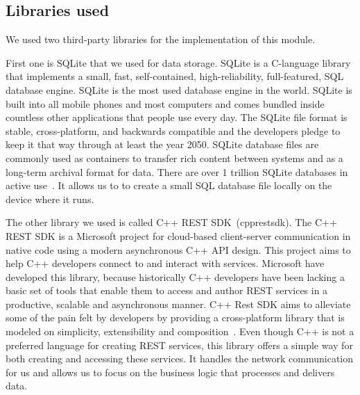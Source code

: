 \subsection{Libraries used}
We used two third-party libraries for the implementation of this module.
\par
First one is SQLite that we used for data storage. SQLite is a C-language library that implements a small, fast, self-contained, high-reliability, full-featured, SQL database engine. SQLite is the most used database engine in the world. SQLite is built into all mobile phones and most computers and comes bundled inside countless other applications that people use every day. The SQLite file format is stable, cross-platform, and backwards compatible and the developers pledge to keep it that way through at least the year 2050. SQLite database files are commonly used as containers to transfer rich content between systems and as a long-term archival format for data. There are over 1 trillion SQLite databases in active use~\citep{sqlite}. It allows us to to create a small SQL database file locally on the device where it runs.
\par
The other library we used is called C++ REST SDK~(cpprestsdk). The C++ REST SDK is a Microsoft project for cloud-based client-server communication in native code using a modern asynchronous C++ API design. This project aims to help C++ developers connect to and interact with services. Microsoft have developed this library, because historically C++ developers have been lacking a basic set of tools that enable them to access and author REST services in a productive, scalable and asynchronous manner. C++ Rest SDK aims to alleviate some of the pain felt by developers by providing a cross-platform library that is modeled on simplicity, extensibility and composition~\citep{cpprestsdk}. Even though C++ is not a preferred language for creating REST services, this library offers a simple way for both creating and accessing these services. It handles the network communication for us and allows us to focus on the business logic that processes and delivers data.


